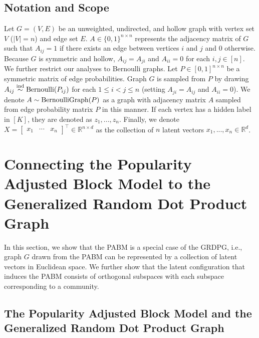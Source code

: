 \documentclass[12pt]{article}
\begin{document}
\hypertarget{notation}{%
\subsection{Notation and Scope}\label{notation}}

Let $G = (V, E)$ be an unweighted, undirected, 
and hollow graph with vertex set $V$ ($|V| = n$) and edge set $E$. 
$A \in \{0, 1\}^{n \times n}$ represents the adjacency matrix of $G$ 
such that $A_{ij} = 1$ if there exists an edge between vertices $i$ and $j$ 
and $0$ otherwise. Because $G$ is symmetric and hollow,
$A_{ij} = A_{ji}$ and $A_{ii} = 0$ for each $i, j \in [n]$. 
We further restrict our analyses to Bernoulli graphs. 
Let $P \in [0, 1]^{n \times n}$ be a symmetric matrix of edge probabilities. 
Graph $G$ is sampled from $P$ by drawing $A_{ij} \stackrel{\mathrm{ind}}{\sim} \mathrm{Bernoulli}(P_{ij})$ 
for each $1 \leq i < j \leq n$ (setting $A_{ji} = A_{ij}$ and $A_{ii} = 0$). 
We denote $A \sim \mathrm{BernoulliGraph}(P)$ as a graph with adjacency matrix $A$ 
sampled from edge probability matrix $P$ in this manner. 
If each vertex has a hidden label in $[K]$, 
they are denoted as $z_1, ..., z_n$. 
Finally, we denote 
$X = \begin{bmatrix} x_1 & \cdots & x_n \end{bmatrix}^\top \in \mathbb{R}^{n \times d}$ 
as the collection of $n$ latent vectors $x_1, ..., x_n \in \mathbb{R}^d$.

\hypertarget{connecting-the-popularity-adjusted-block-model-to-the-generalized-random-dot-product-graph}{%
\section{Connecting the Popularity Adjusted Block Model to the
Generalized Random Dot Product
Graph}\label{connecting-the-popularity-adjusted-block-model-to-the-generalized-random-dot-product-graph}}

In this section, we show that the PABM is a special case of the GRDPG, i.e.,
graph $G$ drawn from the PABM can be represented by a collection of latent
vectors in Euclidean space. We further show that the latent configuration that
induces the PABM consists of orthogonal subspaces with each subspace
corresponding to a community.

\hypertarget{the-popularity-adjusted-block-model-and-the-generalized-random-dot-product-graph}{%
\subsection{The Popularity Adjusted Block Model and the Generalized
Random Dot Product
Graph}\label{the-popularity-adjusted-block-model-and-the-generalized-random-dot-product-graph}}
\end{document}
